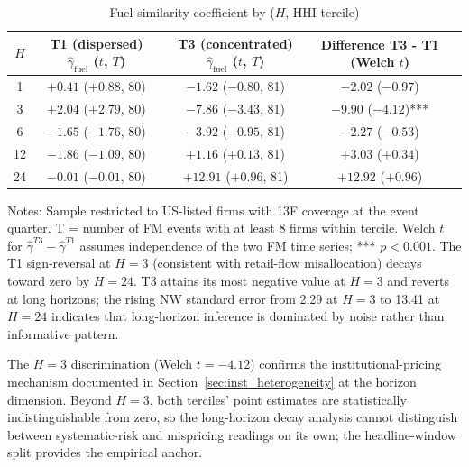\documentclass[12pt,a4paper]{article}
\begin{document}
\begin{table}[H]
\centering
\caption{Fuel-similarity coefficient by ($H$, HHI tercile)}
\label{tab:horizon_ownership}
\begin{tabular}{ccccc}
\toprule
$H$ & T1 (dispersed) $\hat\gamma_{\text{fuel}}$ ($t$, $T$) & T3 (concentrated) $\hat\gamma_{\text{fuel}}$ ($t$, $T$) & Difference T3 - T1 (Welch $t$) \\
\midrule
1  & $+0.41$ ($+0.88$, 80) & $-1.62$ ($-0.80$, 81) & $-2.02$ ($-0.97$) \\
3  & $+2.04$ ($+2.79$, 80) & $-7.86$ ($-3.43$, 81) & $-9.90$ ($-4.12$)*** \\
6  & $-1.65$ ($-1.76$, 80) & $-3.92$ ($-0.95$, 81) & $-2.27$ ($-0.53$) \\
12 & $-1.86$ ($-1.09$, 80) & $+1.16$ ($+0.13$, 81) & $+3.03$ ($+0.34$) \\
24 & $-0.01$ ($-0.01$, 80) & $+12.91$ ($+0.96$, 81) & $+12.92$ ($+0.96$) \\
\bottomrule
\end{tabular}
\begin{flushleft}\footnotesize
Notes: Sample restricted to US-listed firms with 13F coverage at the event quarter. T = number of FM events with at least 8 firms within tercile. Welch $t$ for $\hat\gamma^{T3} - \hat\gamma^{T1}$ assumes independence of the two FM time series; *** $p < 0.001$. The T1 sign-reversal at $H = 3$ (consistent with retail-flow misallocation) decays toward zero by $H = 24$. T3 attains its most negative value at $H = 3$ and reverts at long horizons; the rising NW standard error from 2.29 at $H = 3$ to 13.41 at $H = 24$ indicates that long-horizon inference is dominated by noise rather than informative pattern.
\end{flushleft}
\end{table}

The $H = 3$ discrimination (Welch $t = -4.12$) confirms the institutional-pricing mechanism documented in Section~\ref{sec:inst_heterogeneity} at the horizon dimension. Beyond $H = 3$, both terciles' point estimates are statistically indistinguishable from zero, so the long-horizon decay analysis cannot distinguish between systematic-risk and mispricing readings on its own; the headline-window split provides the empirical anchor.
\end{document}
